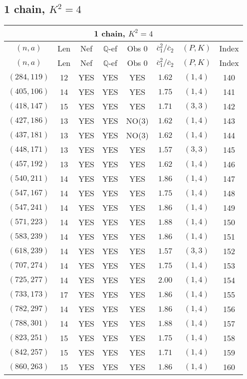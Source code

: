 \subsection{1 chain, $K^2 = 4$}
\begin{longtable}{|c|c|c|c|c|c|c|c|}
\hline
\multicolumn{8}{|c|}{1 chain, $K^2 = 4$}\\
\hline
$(n,a)$ & Len & Nef & $\mathbb Q$-ef & Obs 0 & $\overline c_1^2 / \overline c_2$ & $(P,K)$ & Index\\
\hline
\endfirsthead

\hline
$(n,a)$ & Len & Nef & $\mathbb Q$-ef & Obs 0 & $\overline c_1^2 / \overline c_2$ & $(P,K)$ & Index\\
\hline
\endhead
\hline
\endfoot

$(284,119)$ & 12 & YES & YES & YES & $1.62$ & $(1,4)$ & 140\\
$(405,106)$ & 14 & YES & YES & YES & $1.75$ & $(1,4)$ & 141\\
$(418,147)$ & 15 & YES & YES & YES & $1.71$ & $(3,3)$ & 142\\
$(427,186)$ & 13 & YES & YES & NO(3) & $1.62$ & $(1,4)$ & 143\\
$(437,181)$ & 13 & YES & YES & NO(3) & $1.62$ & $(1,4)$ & 144\\
$(448,171)$ & 13 & YES & YES & YES & $1.57$ & $(3,3)$ & 145\\
$(457,192)$ & 13 & YES & YES & YES & $1.62$ & $(1,4)$ & 146\\
$(540,211)$ & 14 & YES & YES & YES & $1.86$ & $(1,4)$ & 147\\
$(547,167)$ & 14 & YES & YES & YES & $1.75$ & $(1,4)$ & 148\\
$(547,241)$ & 14 & YES & YES & YES & $1.86$ & $(1,4)$ & 149\\
$(571,223)$ & 14 & YES & YES & YES & $1.88$ & $(1,4)$ & 150\\
$(583,239)$ & 14 & YES & YES & YES & $1.86$ & $(1,4)$ & 151\\
$(618,239)$ & 14 & YES & YES & YES & $1.57$ & $(3,3)$ & 152\\
$(707,274)$ & 14 & YES & YES & YES & $1.75$ & $(1,4)$ & 153\\
$(725,277)$ & 14 & YES & YES & YES & $2.00$ & $(1,4)$ & 154\\
$(733,173)$ & 17 & YES & YES & YES & $1.86$ & $(1,4)$ & 155\\
$(782,297)$ & 14 & YES & YES & YES & $1.86$ & $(1,4)$ & 156\\
$(788,301)$ & 14 & YES & YES & YES & $1.88$ & $(1,4)$ & 157\\
$(823,251)$ & 15 & YES & YES & YES & $1.75$ & $(1,4)$ & 158\\
$(842,257)$ & 15 & YES & YES & YES & $1.71$ & $(1,4)$ & 159\\
$(860,263)$ & 15 & YES & YES & YES & $1.86$ & $(1,4)$ & 160
\end{longtable}
